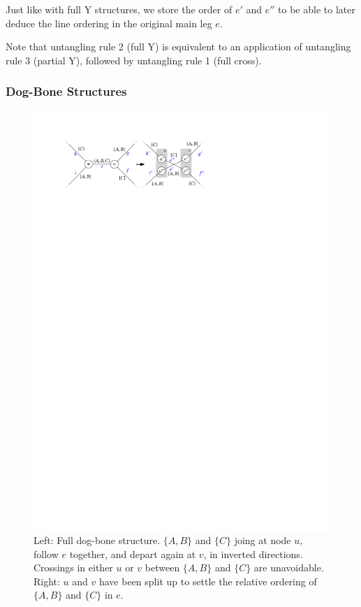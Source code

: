 \documentclass[format=acmsmall, review=false, screen=true]{acmart}
\begin{document}
Just like with full Y structures, we store the order of $e'$ and $e''$ to be able to later deduce the line ordering in the original main leg $e$.

Note that untangling rule 2 (full Y) is equivalent to an application of untangling rule 3 (partial Y), followed by untangling rule 1 (full cross).

\subsubsection{Dog-Bone Structures}\label{SEC:dogbone}

\begin{figure}
\centering
  \includegraphics[width=.7\textwidth, page=1]{untangling/dogbone.pdf}
  \caption{Left: Full dog-bone structure. $\{A, B\}$ and $\{C\}$ joing at node $u$, follow $e$ together, and depart again at $v$, in inverted directions. Crossings in either $u$ or $v$ between $\{A, B\}$ and $\{C\}$ are unavoidable. Right: $u$ and $v$ have been split up to settle the relative ordering of $\{A, B\}$ and $\{C\}$ in $e$.}  
  \label{FIG:untangle_dogbone}

\end{figure}
\end{document}
